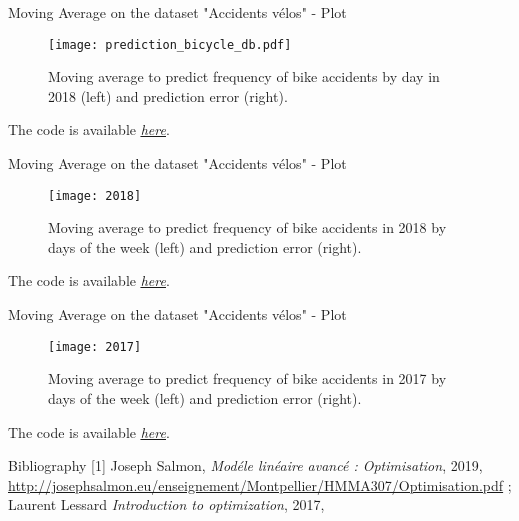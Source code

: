 \documentclass[unknownkeysallowed]{beamer}
\begin{document}
 \begin{frame}{Moving Average on the dataset "Accidents vélos" - Plot}
\begin{figure}[!h]
     \begin{center}
   \caption{\label{étiquette}Moving average to predict frequency of bike accidents by day in 2018 (left) and prediction error (right).}
   \texttt{[image: prediction\_bicycle\_db.pdf]}
   \end{center}
    \end{figure}
The code is available \href{https://github.com/Cindy-dotcom1/MLA/blob/master/Notebooks/bicycle_daily_accident_prediction.ipynb}{\textit{\underline{here}}}.
 \end{frame}
 \begin{frame}{Moving Average on the dataset "Accidents vélos" - Plot}
\begin{figure}[!h]
     \begin{center}
   \caption{\label{étiquette}Moving average to predict frequency of bike accidents in 2018 by days of the week (left) and prediction error (right).}
   \texttt{[image: 2018]}
   \end{center}
    \end{figure}
The code is available \href{https://github.com/Cindy-dotcom1/MLA/blob/master/Notebooks/Bicycle_2018.ipynb}{\textit{\underline{here}}}.
 \end{frame}
 \begin{frame}{Moving Average on the dataset "Accidents vélos" - Plot}
\begin{figure}[!h]
     \begin{center}
   \caption{\label{étiquette}Moving average to predict frequency of bike accidents in 2017 by days of the week (left) and prediction error (right).}
   \texttt{[image: 2017]}
   \end{center}
    \end{figure}
The code is available \href{https://github.com/Cindy-dotcom1/MLA/blob/master/Notebooks/Bicycle-2017.ipynb}{\textit{\underline{here}}}.
 \end{frame}
\begin{frame}{Bibliography}
[1] Joseph Salmon, \textit{Modéle linéaire avancé : Optimisation}, 2019, \url{http://josephsalmon.eu/enseignement/Montpellier/HMMA307/Optimisation.pdf} ; \\
[2] Laurent Lessard \textit{Introduction to optimization}, 2017,

\printbibliography
\end{frame}
\end{document}
